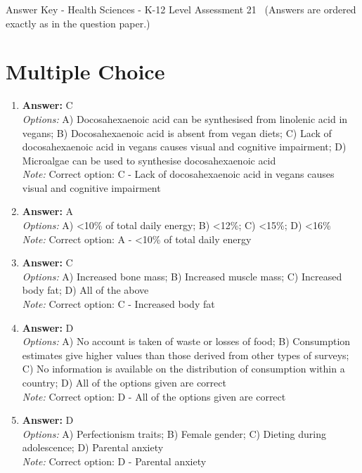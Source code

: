 \documentclass[12pt]{article}
\begin{document}
\begin{center}
Answer Key - Health Sciences - K-12 Level Assessment 21 \
\small (Answers are ordered exactly as in the question paper.)
\end{center}

\section*{Multiple Choice}
\begin{enumerate}[label=\arabic*.]
\item \textbf{Answer:} C
\\ \textit{Options:} A) Docosahexaenoic acid can be synthesised from linolenic acid in vegans; B) Docosahexaenoic acid is absent from vegan diets; C) Lack of docosahexaenoic acid in vegans causes visual and cognitive impairment; D) Microalgae can be used to synthesise docosahexaenoic acid
\\ \textit{Note:} Correct option: C - Lack of docosahexaenoic acid in vegans causes visual and cognitive impairment
\item \textbf{Answer:} A
\\ \textit{Options:} A) \textless{}10\% of total daily energy; B) \textless{}12\%; C) \textless{}15\%; D) \textless{}16\%
\\ \textit{Note:} Correct option: A - \textless{}10\% of total daily energy
\item \textbf{Answer:} C
\\ \textit{Options:} A) Increased bone mass; B) Increased muscle mass; C) Increased body fat; D) All of the above
\\ \textit{Note:} Correct option: C - Increased body fat
\item \textbf{Answer:} D
\\ \textit{Options:} A) No account is taken of waste or losses of food; B) Consumption estimates give higher values than those derived from other types of surveys; C) No information is available on the distribution of consumption within a country; D) All of the options given are correct
\\ \textit{Note:} Correct option: D - All of the options given are correct
\item \textbf{Answer:} D
\\ \textit{Options:} A) Perfectionism traits; B) Female gender; C) Dieting during adolescence; D) Parental anxiety
\\ \textit{Note:} Correct option: D - Parental anxiety
\end{enumerate}
\end{document}
